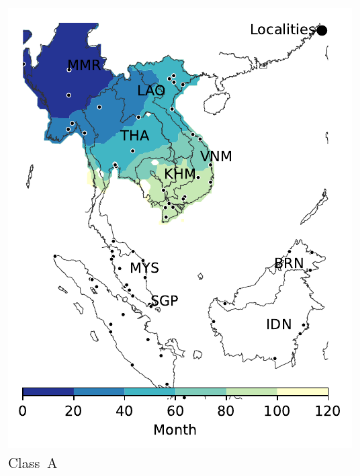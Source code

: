\documentclass[11pt]{article}
\theoremstyle{definition}
\begin{document}
\begin{figure}[ht]
    \centering
\begin{subfigure}[b]{.47\textwidth}
    \includegraphics[width=\textwidth]{../cellular_automata/results/contour/MSA_model-A_m2_l1.pdf}
    \caption{Class~A\label{fig:msaClassA}}
\end{subfigure}\hspace{.5cm}
\begin{subfigure}[b]{.47\textwidth}

\end{subfigure}
\end{figure}
\end{document}
